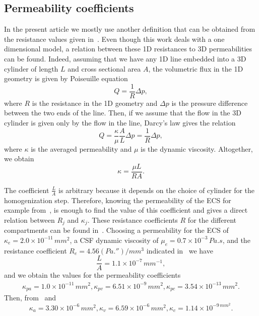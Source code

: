 \documentclass[10pt]{article}
\newcommand{\1}{^{(1)}}
\newcommand{\2}{^{(2)}}
\begin{document}
\subsection{Permeability coefficients}

In the present article we mostly use another definition that can be obtained from the resistance values given in~\cite{Vinje-2020-ICP}. Even though this work deals with a one dimensional model, a relation between these 1D resistances to 3D permeabilities can be found. 
Indeed, assuming that we have any 1D line embedded into a 3D cylinder of length $L$ and cross sectional area $A$, the volumetric flux in the 1D geometry is given by Poiseuille equation
\[
    Q = \frac{1}{R} \Delta p,
\]
where $R$ is the resistance in the 1D geometry and $\Delta p$ is the pressure difference between the two ends of the line.
Then, if we assume that the flow in the 3D cylinder is given only by the flow in the line, Darcy's law gives the relation 
\[
    Q = \frac{\kappa}{\mu} \frac{A}{L} \Delta p  = \frac{1}{R} \Delta p,
\]
where $\kappa$ is the averaged permeability and $\mu$ is the dynamic viscosity. 
Altogether, we obtain 
\begin{equation}
\kappa = \frac{\mu L}{R A}.
\label{eq:relation-resistance-permeability}
\end{equation}

The coefficient $\frac{L}{A}$ is arbitrary because it depends on the choice of cylinder for the homogenization step. 
Therefore, knowing the permeability of the ECS for example from~\cite{Holter9894}, is enough to find the value of this coefficient and gives a direct relation between $R_j$ and $\kappa_j$. 
These resistance coefficients $R$ for the different compartments can be found in~\cite{Vinje-2020-ICP}.
Choosing a permeability for the ECS of $\kappa_e = 2.0\times 10^{-11}\,\si{mm^2}$, a CSF dynamic viscosity of $\mu_e = 0.7\times 10^{-3}\, \si{Pa.s}$, and the resistance coefficient $R_e = 4.56 \si{(Pa . \second)\per mm^3} $ indicated in~\cite{Vinje-2020-ICP} we have 
\[
    \frac{L}{A} = 1.1 \times 10^{-7}\, \si{mm^{-1}},
\]
and we obtain the values for the permeability coefficients
\[
\begin{aligned}
\kappa_{pa} = 1.0 \times 10^{-11}\,\si{mm^2}, \kappa_{pv} = 6.51\times 10^{-9}\,\si{mm^2}, \kappa_{pc} = 3.54\times 10^{-13}\,\si{mm^2}. 
\end{aligned}
\]
Then, from~\cite{el2015multi} and~\cite{jozsa2021porous}
\[
\kappa_a =  3.30 \times 10^{-6}\,\si{mm^2}, \kappa_v =6.59 \times 10^{-6}\,\si{mm^2}, \kappa_c = 1.14 \times 10^{-9\,\si{mm^2}}.
\]
\end{document}
